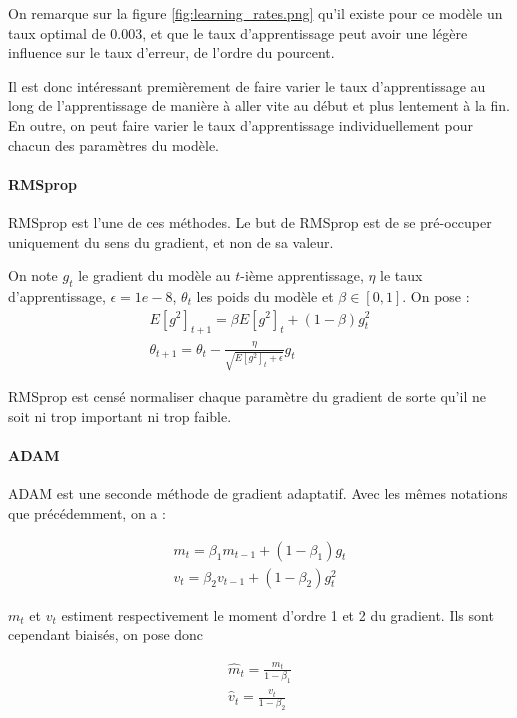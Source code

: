 On remarque sur la figure \ref{fig:learning_rates.png} qu'il existe pour ce modèle un taux optimal de $0.003$, et que le taux d'apprentissage peut avoir 
une légère influence sur le taux d'erreur, de l'ordre du pourcent.

Il est donc intéressant premièrement de faire varier le taux d'apprentissage au long de l'apprentissage de manière à aller vite au début et plus lentement à la fin. En outre, on peut faire varier le taux d'apprentissage individuellement pour chacun des paramètres du modèle.

\paragraph{RMSprop}

RMSprop est l'une de ces méthodes. Le but de RMSprop est de se pré-occuper uniquement du sens du gradient, et non de sa valeur. 

On note $g_t$ le gradient du modèle au $t$-ième apprentissage, $\eta$ le taux d'apprentissage, $\epsilon = 1e-8$, $\theta_t$ les poids du modèle et $\beta \in [0,1]$.
On pose :
\begin{align}
E[g^2]_{t+1} = \beta E[g^2]_{t} + (1-\beta) g_t^2 \\
\theta_{t+1} = \theta_t - \frac{\eta}{\sqrt{E[g^2]_{t} + \epsilon }} g_t 
\end{align}

RMSprop est censé normaliser chaque paramètre du gradient de sorte qu'il ne soit ni trop important ni trop faible.

\paragraph{ADAM}
ADAM est une seconde méthode de gradient adaptatif. Avec les mêmes notations que précédemment, on a :

\begin{align}
m_t = \beta_1 m_{t-1} + (1- \beta_1)g_t \\
v_t = \beta_2 v_{t-1} + (1- \beta_2)g_t^2 
\end{align}

$m_t$ et $v_t$ estiment respectivement le moment d'ordre 1 et 2 du gradient.
Ils sont cependant biaisés, on pose donc

\begin{align}
\hat{m}_t = \frac{m_t}{1 - \beta_1} \\
\hat{v}_t = \frac{v_t}{1 - \beta_2}
\end{align}

